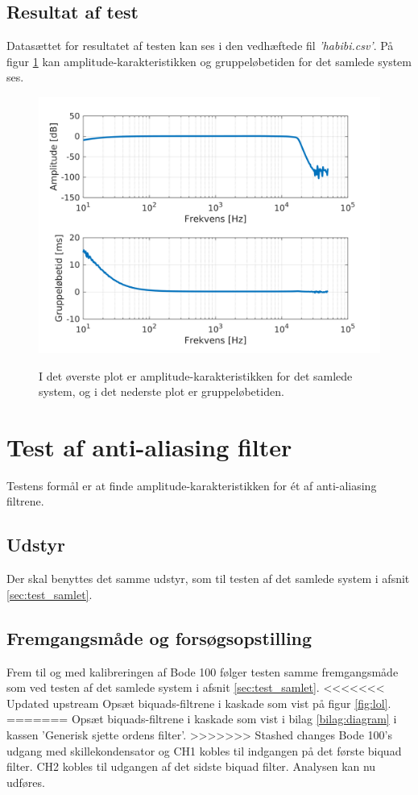 \subsection{Resultat af test}
Datasættet for resultatet af testen kan ses i den vedhæftede fil \textit{'habibi.csv'}. På figur \ref{fig:tf_tg_samletsystem} kan amplitude-karakteristikken og gruppeløbetiden for det samlede system ses.
\begin{figure}[h]
	\caption{I det øverste plot er amplitude-karakteristikken for det samlede system, og i det nederste plot er gruppeløbetiden.}
	\includegraphics[width=1\linewidth]{matlab/tf_tg_samletsystem.png}
	\label{fig:tf_tg_samletsystem}
\end{figure}

\section{Test af anti-aliasing filter}
\label{sec:test_aafilter}
Testens formål er at finde amplitude-karakteristikken for ét af anti-aliasing filtrene. 

\subsection{Udstyr}
Der skal benyttes det samme udstyr, som til testen af det samlede system i afsnit \ref{sec:test_samlet}.

\subsection{Fremgangsmåde og forsøgsopstilling}
Frem til og med kalibreringen af Bode 100 følger testen samme fremgangsmåde som ved testen af det samlede system i afsnit \ref{sec:test_samlet}. \newline
<<<<<<< Updated upstream
Opsæt biquads-filtrene i kaskade som vist på figur \ref{fig:lol}. 
=======
Opsæt biquads-filtrene i kaskade som vist i bilag \ref{bilag:diagram} i kassen 'Generisk sjette ordens filter'. 
>>>>>>> Stashed changes
Bode 100's udgang med skillekondensator og CH1 kobles til indgangen på det første biquad filter. 
CH2 kobles til udgangen af det sidste biquad filter. \newline
Analysen kan nu udføres. 

